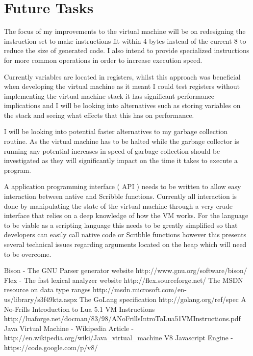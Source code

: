 \documentclass[]{final_report}
\begin{document}
\section { Future Tasks }

The focus of my improvements to the virtual machine will be on redesigning the instruction set to make instructions fit within 4 bytes instead of the current 8 to reduce the size of generated code. I also intend to provide specialized instructions for more common operations in order to increase execution speed.

Currently variables are located in registers, whilst this approach was beneficial when developing the virtual machine as it meant I could test registers without implementing the virtual machine stack it has significant performance implications and I will be looking into alternatives such as storing variables on the stack and seeing what effects that this has on performance.

I will be looking into potential faster alternatives to my garbage collection routine. As the virtual machine has to be halted while the garbage collector is running any potential increases in speed of garbage collection should be investigated as they will significantly impact on the time it takes to execute a program.

A application programming interface ( API ) needs to be written to allow easy interaction between native and Scribble functions. Currently all interaction is done by manipulating the state of the virtual machine through a very crude interface that relies on a deep knowledge of how the VM works. For the language to be viable as a scripting language this needs to be greatly simplified so that developers can easily call native code or Scribble functions however this presents several technical issues regarding arguments located on the heap which will need to be overcome.

\newpage
\begin{thebibliography}{99}
 Bison - The GNU Parser generator website http://www.gnu.org/software/bison/
 Flex - The fast lexical analyzer website http://flex.sourceforge.net/
 The MSDN resource on data type ranges http://msdn.microsoft.com/en-us/library/s3f49ktz.aspx
 The GoLang specification http://golang.org/ref/spec
 A No-Frills Introduction to Lua 5.1 VM Instructions http://luaforge.net/docman/83/98/ANoFrillsIntroToLua51VMInstructions.pdf‎
 Java Virtual Machine - Wikipedia Article - http://en.wikipedia.org/wiki/Java\_virtual\_machine
 V8 Javascript Engine - https://code.google.com/p/v8/
\end{thebibliography}
\label{endpage}
\end{document}
